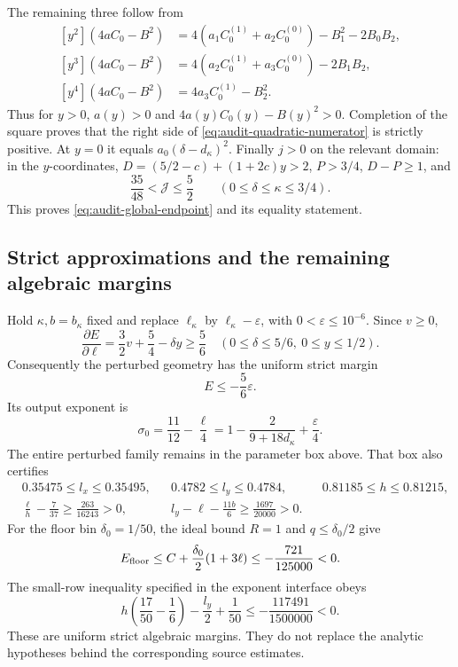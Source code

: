 \documentclass[11pt,a4paper]{article}
\numberwithin{equation}{section}
\theoremstyle{remark}
\begin{document}
The remaining three follow from
\[
\begin{aligned}
 [y^2](4aC_0-B^2)&=4(a_1C_0^{(1)}+a_2C_0^{(0)})-B_1^2-2B_0B_2,\\
 [y^3](4aC_0-B^2)&=4(a_2C_0^{(1)}+a_3C_0^{(0)})-2B_1B_2,\\
 [y^4](4aC_0-B^2)&=4a_3C_0^{(1)}-B_2^2.
\end{aligned}
\]
Thus for \(y>0\), \(a(y)>0\) and \(4a(y)C_0(y)-B(y)^2>0\).
Completion of the square proves that the right side of
\eqref{eq:audit-quadratic-numerator} is strictly positive.  At \(y=0\)
it equals \(a_0(\delta-d_\kappa)^2\).
Finally \(j>0\) on the relevant domain: in the \(y\)-coordinates,
\(D=(5/2-c)+(1+2c)y>2\), \(P>3/4\), \(D-P\ge1\), and
\[
 \frac{35}{48}<\mathcal J\le\frac52
 \qquad(0\le\delta\le\kappa\le3/4).
\]
This proves \eqref{eq:audit-global-endpoint} and its equality statement.

\subsection{Strict approximations and the remaining algebraic margins}

Hold \(\kappa,b=b_\kappa\) fixed and replace
\(\ell_\kappa\) by \(\ell_\kappa-\varepsilon\), with
\(0<\varepsilon\le10^{-6}\).  Since \(v\ge0\),
\[
 \frac{\partial E}{\partial\ell}
   =\frac32v+\frac54-\delta y\ge\frac56
 \quad(0\le\delta\le5/6,\ 0\le y\le1/2).
\]
Consequently the perturbed geometry has the uniform strict margin
\begin{equation}\label{eq:audit-strict-margin}
 E\le-\frac56\varepsilon.
\end{equation}
Its output exponent is
\[
 \sigma_0=\frac{11}{12}-\frac\ell4
 =1-\frac2{9+18d_\kappa}+\frac\varepsilon4.
\]
The entire perturbed family remains in the parameter box above.
That box also certifies
\[
\begin{aligned}
 &0.35475\le l_x\le0.35495,
 &&0.4782\le l_y\le0.4784,
 &&0.81185\le h\le0.81215,\\
 &\frac\ell h-\frac7{37}\ge\frac{263}{16243}>0,
 &&l_y-\ell-\frac{11b}{6}\ge\frac{1697}{20000}>0.
\end{aligned}
\]
For the floor bin \(\delta_0=1/50\), the ideal bound \(R=1\)
and \(q\le\delta_0/2\) give
\[
 E_{\rm floor}\le
 C+\frac{\delta_0}{2}(1+3\ell)
 \le-\frac{721}{125000}<0.
\]
The small-row inequality specified in the exponent interface obeys
\[
 h\left(\frac{17}{50}-\frac16\right)-\frac{l_y}{2}+\frac1{50}
 \le-\frac{117491}{1500000}<0.
\]
These are uniform strict algebraic margins.  They do not replace the
analytic hypotheses behind the corresponding source estimates.
\end{document}

